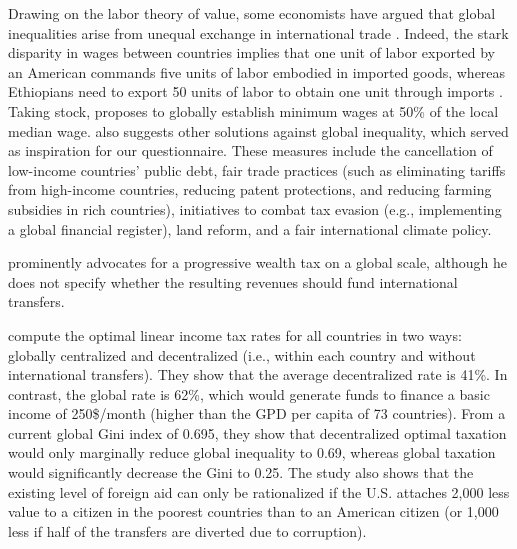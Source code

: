 Drawing on the labor theory of value, some economists have argued that global inequalities arise from unequal exchange in international trade \citep{arghiri_unequal_1972}. Indeed, the stark disparity in wages between countries implies that one unit of labor exported by an American commands five units of labor embodied in imported goods, whereas Ethiopians need to export 50 units of labor to obtain one unit through imports \citep{alsamawi_employment_2014,reyes_better_2017}.
Taking stock, \citet{hickel_divide_2017} proposes to globally establish minimum wages at 50\% of the local median wage. \citet{hickel_divide_2017} also suggests other solutions against global inequality, which served as inspiration for our questionnaire. These measures include the cancellation of low-income countries' public debt, fair trade practices (such as eliminating tariffs from high-income countries, reducing patent protections, and reducing farming subsidies in rich countries), initiatives to combat tax evasion (e.g., implementing a global financial register), land reform, and a fair international climate policy. 

\citet{piketty_capital_2014} prominently advocates for a progressive wealth tax on a global scale, although he does not specify whether the resulting revenues should fund international transfers. %

\citet{kopczuk_limitations_2005} compute the optimal linear income tax rates for all countries in two ways: globally centralized and decentralized (i.e., within each country and without international transfers). They show that the average decentralized rate is 41\%. In contrast, the global rate is 62\%, which would generate funds to finance a basic income of 250\$/month (higher than the GPD per capita of 73 countries). From a current global Gini index of 0.695, they show that decentralized optimal taxation would only marginally reduce global inequality to 0.69, whereas global taxation would significantly decrease the Gini to 0.25. The study also shows that the existing level of foreign aid can only be rationalized if the U.S. attaches 2,000 less value to a citizen in the poorest countries than to an American citizen (or 1,000 less if half of the transfers are diverted due to corruption). 

